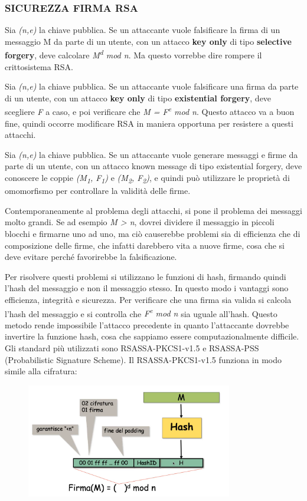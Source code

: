 \subsubsection{SICUREZZA FIRMA RSA}
Sia \textit{(n,e)} la chiave pubblica. Se un attaccante vuole falsificare la firma di un messaggio M da parte di un utente, con un attacco \textbf{key only} di tipo \textbf{selective forgery}, deve calcolare \textit{M\textsuperscript{d} mod n}. Ma questo vorrebbe dire rompere il crittosistema RSA. 

Sia \textit{(n,e)} la chiave pubblica. Se un attaccante vuole falsificare una firma da parte di un utente, con un attacco \textbf{key only} di tipo \textbf{existential forgery}, deve scegliere \textit{F} a caso, e poi verificare che \textit{M = F\textsuperscript{e} mod n}. Questo attacco va a buon fine, quindi occorre modificare RSA in maniera opportuna per resistere a questi attacchi.

Sia \textit{(n,e)} la chiave pubblica. Se un attaccante vuole generare messaggi e firme da parte di un utente, con un attacco known message di tipo existential forgery, deve conoscere le coppie \textit{(M\textsubscript{1}, F\textsubscript{1})} e \textit{(M\textsubscript{2}, F\textsubscript{2})}, e quindi può utilizzare le proprietà di omomorfismo per controllare la validità delle firme. 

Contemporaneamente al problema degli attacchi, si pone il problema dei messaggi molto grandi. Se ad esempio \textit{M > n}, dovrei dividere il messaggio in piccoli blocchi e firmarne uno ad uno, ma ciò causerebbe problemi sia di efficienza che di composizione delle firme, che infatti darebbero vita a nuove firme, cosa che si deve evitare perché favorirebbe la falsificazione. 

Per risolvere questi problemi si utilizzano le funzioni di hash, firmando quindi l'hash del messaggio e non il messaggio stesso. In questo modo i vantaggi sono efficienza, integrità e sicurezza. Per verificare che una firma sia valida si calcola l'hash del messaggio e si controlla che \textit{F\textsuperscript{e} mod n } sia uguale all'hash. Questo metodo rende impossibile l'attacco precedente in quanto l'attaccante dovrebbe invertire la funzione hash, cosa che sappiamo essere computazionalmente difficile. Gli standard più utilizzati sono RSASSA-PKCS1-v1.5 e RSASSA-PSS (Probabilistic Signature Scheme). Il RSASSA-PKCS1-v1.5 funziona in modo simile alla cifratura:

\begin{figure}[htb!]
    \centering
    \includegraphics[width=9cm]{./Images/cap1/1.52.png}
\end{figure} 

